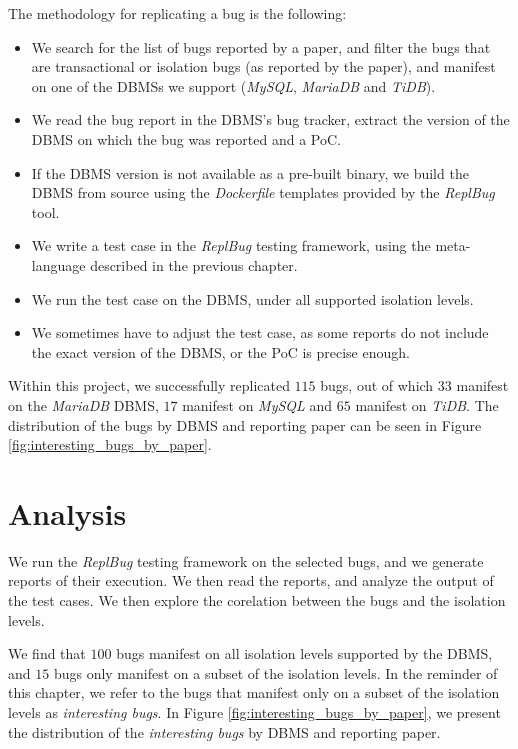 The methodology for replicating a bug is the following:
\begin{itemize}
    \item We search for the list of bugs reported by a paper, and filter the bugs that are transactional or isolation bugs (as reported by the paper), and manifest on one of the DBMSs we support (\textit{MySQL}, \textit{MariaDB} and \textit{TiDB}).
    \item We read the bug report in the DBMS's bug tracker, extract the version of the DBMS on which the bug was reported and a PoC.
    \item If the DBMS version is not available as a pre-built binary, we build the DBMS from source using the \textit{Dockerfile} templates provided by the \textit{ReplBug} tool.
    \item We write a test case in the \textit{ReplBug} testing framework, using the meta-language described in the previous chapter.
    \item We run the test case on the DBMS, under all supported isolation levels.
    \item We sometimes have to adjust the test case, as some reports do not include the exact version of the DBMS, or the PoC is precise enough. 
\end{itemize}

Within this project, we successfully replicated $115$ bugs, out of which $33$ manifest on the \textit{MariaDB} DBMS, $17$ manifest on \textit{MySQL} and $65$ manifest on \textit{TiDB}. The distribution of the bugs by DBMS and reporting paper can be seen in Figure \ref{fig:interesting_bugs_by_paper}.

\section{Analysis}

We run the \textit{ReplBug} testing framework on the selected bugs, and we generate reports of their execution. We then read the reports, and analyze the output of the test cases. We then explore the corelation between the bugs and the isolation levels.

We find that $100$ bugs manifest on all isolation levels supported by the DBMS, and $15$ bugs only manifest on a subset of the isolation levels. In the reminder of this chapter, we refer to the bugs that manifest only on a subset of the isolation levels as \textit{interesting bugs}. In Figure \ref{fig:interesting_bugs_by_paper}, we present the distribution of the \textit{interesting bugs} by DBMS and reporting paper.

